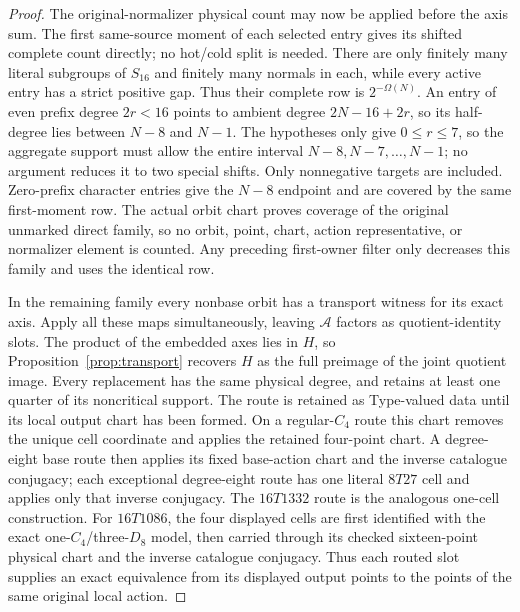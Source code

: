 \begin{proof}
The original-normalizer physical count may now be applied before the axis
sum.  The first same-source moment of each selected entry gives its shifted
complete count directly; no hot/cold split is needed.  There are only finitely
many literal subgroups of $S_{16}$ and finitely many normals in each, while
every active entry has a strict positive gap.  Thus their complete row is
$2^{-\Omega(N)}$.  An entry of even prefix degree $2r<16$ points to ambient
degree $2N-16+2r$, so its half-degree lies between $N-8$ and $N-1$.
The hypotheses only give $0\leq r\leq7$, so the aggregate support must allow
the entire interval $N-8,N-7,\ldots,N-1$; no argument reduces it to two
special shifts. Only nonnegative targets are included. Zero-prefix character
entries give the $N-8$ endpoint and are covered by the same first-moment row.
The actual orbit chart proves coverage of the original unmarked direct
family, so no orbit, point, chart, action representative, or normalizer element
is counted.  Any preceding first-owner filter only decreases this family and
uses the identical row.

In the remaining family every nonbase orbit has a transport witness
for its exact axis. Apply all these maps simultaneously, leaving
$\mathcal A$ factors as quotient-identity slots. The product of the embedded axes lies
in $H$, so Proposition~\ref{prop:transport} recovers $H$ as the full
preimage of the joint quotient image. Every replacement has the same
physical degree, and retains at least one quarter of its noncritical
support.  The route is retained as Type-valued data until its local output
chart has been formed.  On a regular-$C_4$ route this chart removes the
unique cell coordinate and applies the retained four-point chart.  A
degree-eight base route then applies its fixed base-action chart and the
inverse catalogue conjugacy; each exceptional degree-eight route has one
literal $8T27$ cell and applies only that inverse conjugacy.  The $16T1332$
route is the analogous one-cell construction.  For $16T1086$, the four
displayed cells are first identified with the exact one-$C_4$/three-$D_8$
model, then carried through its checked sixteen-point physical chart and
the inverse catalogue conjugacy.  Thus each routed slot supplies an exact
equivalence from its displayed output points to the points of the same
original local action.


\end{proof}
